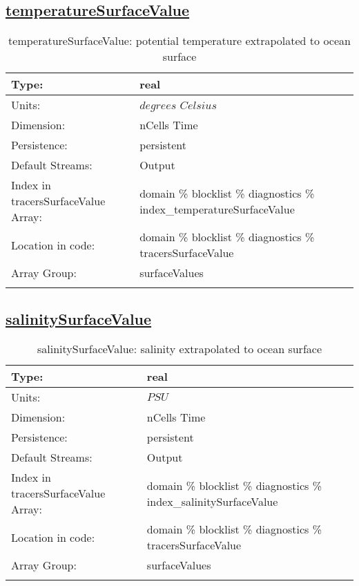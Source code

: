 \subsection[temperatureSurfaceValue]{\hyperref[sec:var_tab_diagnostics]{temperatureSurfaceValue}}
\label{subsec:var_sec_diagnostics_temperatureSurfaceValue}
\begin{center}
\begin{longtable}{| p{2.0in} | p{4.0in} |}
        \hline 
        Type: & real \\
        \hline 
        Units: & $degrees$ $Celsius$ \\
        \hline 
        Dimension: & nCells Time \\
        \hline 
        Persistence: & persistent \\
        \hline 
		 Default Streams: & Output  \\
        \hline 
		 Index in tracersSurfaceValue Array: & domain \% blocklist \% diagnostics \% index\_temperatureSurfaceValue \\
		 \hline 
		 Location in code: & domain \% blocklist \% diagnostics \% tracersSurfaceValue \\
		 \hline 
		 Array Group: & surfaceValues \\
		 \hline 
    \caption{temperatureSurfaceValue: potential temperature extrapolated to ocean surface}
\end{longtable}
\end{center}
\subsection[salinitySurfaceValue]{\hyperref[sec:var_tab_diagnostics]{salinitySurfaceValue}}
\label{subsec:var_sec_diagnostics_salinitySurfaceValue}
\begin{center}
\begin{longtable}{| p{2.0in} | p{4.0in} |}
        \hline 
        Type: & real \\
        \hline 
        Units: & $PSU$ \\
        \hline 
        Dimension: & nCells Time \\
        \hline 
        Persistence: & persistent \\
        \hline 
		 Default Streams: & Output  \\
        \hline 
		 Index in tracersSurfaceValue Array: & domain \% blocklist \% diagnostics \% index\_salinitySurfaceValue \\
		 \hline 
		 Location in code: & domain \% blocklist \% diagnostics \% tracersSurfaceValue \\
		 \hline 
		 Array Group: & surfaceValues \\
		 \hline 
    \caption{salinitySurfaceValue: salinity extrapolated to ocean surface}
\end{longtable}
\end{center}
